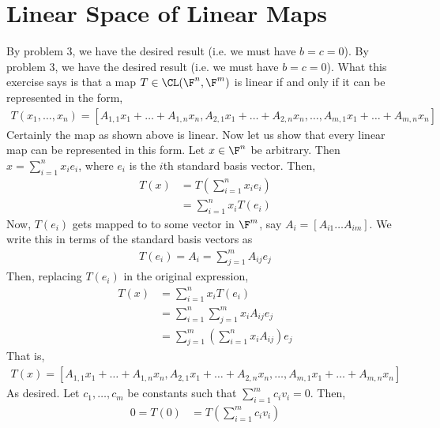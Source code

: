 \documentclass{book}
\begin{document}
\section{Linear Space of Linear Maps}
  \begin{enumerate}[label=\arabic*)]
    \ii 
      By problem 3, we have the desired result (i.e. we must have $b = c = 0$).
    \ii 
      By problem 3, we have the desired result (i.e. we must have $b = c = 0$).
    \ii 
      What this exercise says is that a map $T \in \CL(\F^n, \F^m)$ is linear if and only if it can be represented in the form,
      \begin{align*}
        T(x_1, \dots, x_n) = [A_{1,1}x_1 + \dots + A_{1, n}x_n, A_{2, 1}x_1 + \dots + A_{2, n}x_n, \dots, A_{m, 1}x_1 + \dots + A_{m, n}x_n]
      \end{align*}
      Certainly the map as shown above is linear. Now let us show that every linear map can be represented in this form. Let $x \in \F^n$ be arbitrary. Then $x = \sum_{i = 1}^{n}x_ie_i$, where
      $e_i$ is the $i$th standard basis vector. Then,
      \begin{align*}
        T(x) & = T(\sum_{i = 1}^{n}x_ie_i) \\
        & = \sum_{i = 1}^{n}x_iT(e_i)
      \end{align*}
      Now, $T(e_i)$ gets mapped to to some vector in $\F^m$, say $A_i = [A_{i1} \dots A_{im}]$. We write this in terms of the standard basis vectors as
      \begin{align*}
        T(e_i) = A_i = \sum_{j = 1}^{m}A_{ij}e_j
      \end{align*}
      Then, replacing $T(e_i)$ in the original expression,
      \begin{align*}
        T(x) & = \sum_{i = 1}^{n}x_iT(e_i) \\
        & = \sum_{i = 1}^{n}\sum_{j = 1}^{m}x_iA_{ij}e_j \\
        & = \sum_{j = 1}^{m}(\sum_{i = 1}^{n}x_iA_{ij})e_j
      \end{align*}
      That is,
      \begin{align*}
        T(x) = [A_{1,1}x_1 + \dots + A_{1, n}x_n, A_{2, 1}x_1 + \dots + A_{2, n}x_n, \dots, A_{m, 1}x_1 + \dots + A_{m, n}x_n]
      \end{align*}
      As desired.
    \ii
      Let $c_1, \dots, c_m$ be constants such that $\sum_{i = 1}^{m}c_iv_i = 0$. Then,
      \begin{align*}
        0 = T(0) & = T(\sum_{i = 1}^{m}c_iv_i) \\ 

\end{align*}
\end{enumerate}
\end{document}
